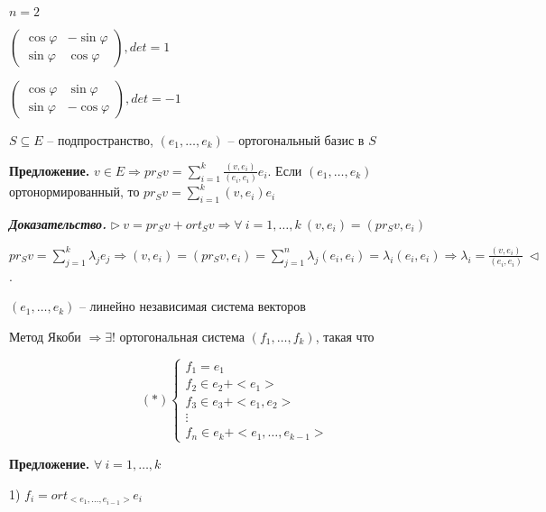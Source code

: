 $n = 2$

$\begin{pmatrix} \cos \varphi & - \sin \varphi \\
\sin \varphi & \cos \varphi \end{pmatrix}, det = 1$

$\begin{pmatrix} \cos \varphi & \sin \varphi \\
\sin \varphi & - \cos \varphi \end{pmatrix}, det = -1$

\vspace{\baselineskip}
$S \subseteq E$ -- подпространство, $(e_1, \dots, e_k)$ -- ортогональный базис в $S$

\vspace{\baselineskip}
\textbf{Предложение.} $v \in E \Rightarrow pr_S v = \sum\limits_{i=1}^k \frac{(v, e_i)}{(e_i, e_i)} e_i$. Если $(e_1, \dots, e_k)$ ортонормированный, то $pr_S v = \sum\limits_{i=1}^k (v, e_i) e_i$

\vspace{\baselineskip}
\textbf{\textit{Доказательство.}} $\rhd \ v = pr_S v + ort_S v \Rightarrow \forall \ i = 1, \dots, k \ (v, e_i) = (pr_S v, e_i)$

$pr_S v = \sum\limits_{j = 1}^k \lambda_j e_j \Rightarrow (v, e_i) = (pr_S v, e_i) = \sum\limits_{j = 1}^n \lambda_j (e_i, e_i) = \lambda_i (e_i, e_i) \Rightarrow \lambda_i = \frac{(v, e_i)}{(e_i, e_i)} \ \lhd$.

\vspace{\baselineskip}
$(e_1, \dots, e_k)$  -- линейно независимая система векторов

Метод Якоби $\Rightarrow \exists!$ ортогональная система $(f_1, \dots, f_k)$, такая что

\begin{equation*}
(*) \begin{cases}
		f_1 = e_1 \\
		f_2 \in e_2 + <e_1> \\
        f_3 \in e_3 + <e_1, e_2> \\
        \vdots \\
        f_n \in e_k + <e_1, \dots, e_{k-1}>
	\end{cases}
\end{equation*}  

\vspace{\baselineskip}
\textbf{Предложение.} $\forall \ i = 1, \dots, k$

1) $f_i = ort_{<e_1, \dots, e_{i-1}>} e_i$

